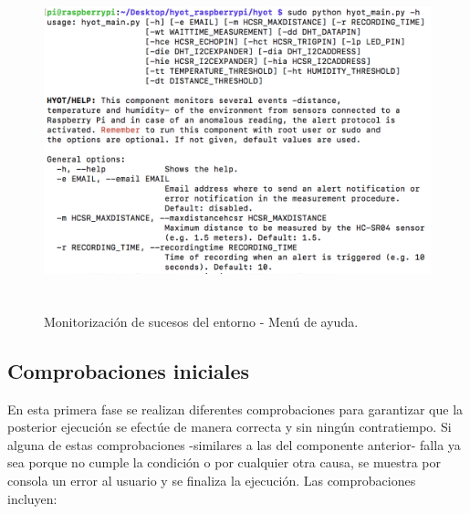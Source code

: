 \documentclass[12pt,a4paper, twoside]{report}
\begin{document}
	\begin{figure}[!ht]   
		\caption{Monitorización de sucesos del entorno - Menú de ayuda.} 
		\begin{center} 
			\includegraphics[width=15cm,height=9cm]{Images/userGuide/monitoring/help} \\
			\label{fig:userguide_monitoring_help} 
		\end{center}  
	\end{figure}
	
	\newpage
	
	 \subsection{Comprobaciones iniciales}
	 	 
	 En esta primera fase se realizan diferentes comprobaciones para garantizar que la posterior ejecución se efectúe de manera correcta y sin ningún contratiempo. Si alguna de estas comprobaciones -similares a las del componente anterior- falla ya sea porque no cumple la condición o por cualquier otra causa, se muestra por consola un error al usuario y se finaliza la ejecución. Las comprobaciones incluyen:
	 
\end{document}
